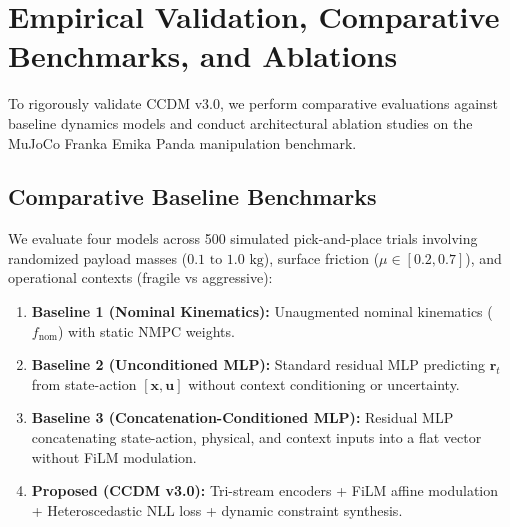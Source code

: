 \documentclass[10pt,a4paper]{article}
\begin{document}
\newpage

\section{Empirical Validation, Comparative Benchmarks, and Ablations}
To rigorously validate CCDM v3.0, we perform comparative evaluations against baseline dynamics models and conduct architectural ablation studies on the MuJoCo Franka Emika Panda manipulation benchmark.

\subsection{Comparative Baseline Benchmarks}
We evaluate four models across 500 simulated pick-and-place trials involving randomized payload masses ($0.1\text{ to }1.0\text{ kg}$), surface friction ($\mu \in [0.2, 0.7]$), and operational contexts (fragile vs aggressive):
\begin{enumerate}
    \item \textbf{Baseline 1 (Nominal Kinematics):} Unaugmented nominal kinematics ($f_{\mathrm{nom}}$) with static NMPC weights.
    \item \textbf{Baseline 2 (Unconditioned MLP):} Standard residual MLP predicting $\mathbf{r}_t$ from state-action $[\mathbf{x}, \mathbf{u}]$ without context conditioning or uncertainty.
    \item \textbf{Baseline 3 (Concatenation-Conditioned MLP):} Residual MLP concatenating state-action, physical, and context inputs into a flat vector without FiLM modulation.
    \item \textbf{Proposed (CCDM v3.0):} Tri-stream encoders + FiLM affine modulation + Heteroscedastic NLL loss + dynamic constraint synthesis.
\end{enumerate}
\end{document}
